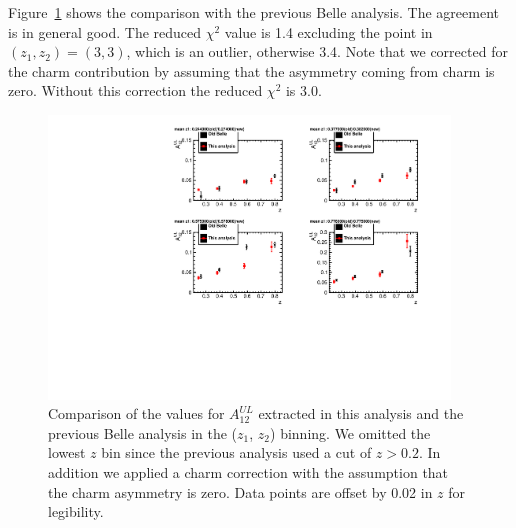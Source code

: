 \fi
Figure~\ref{fig:belleCompCharmCorr} shows the comparison with the previous Belle analysis. The agreement is in general good. 
The reduced $\chi^2$ value is 1.4 excluding the point in $(z_1,z_2)=(3,3)$, which is an outlier, otherwise 3.4.
Note that we corrected for the charm contribution by assuming that the asymmetry coming from charm is zero. 
Without this correction the reduced $\chi^2$ is 3.0. 

\begin{figure}[H]
\includegraphics[width=0.95\textwidth]{figure_asy/BelleCompZ25CharmCorr.pdf}
\caption[Comparison of the values for $A^{UL}_{12}$ extracted in this analysis including charm correction and the previous Belle analysis in the ($z_1$, $z_2$) binning]{\label{fig:belleCompCharmCorr} Comparison of the values for $A^{UL}_{12}$ extracted in this analysis and the previous Belle analysis in the ($z_1$, $z_2$) binning. We omitted the lowest $z$ bin since the previous analysis used a cut of $z>0.2$. In addition we applied a charm correction with the assumption that the charm asymmetry is zero. Data points are offset by 0.02 in $z$ for legibility.}
\end{figure}


